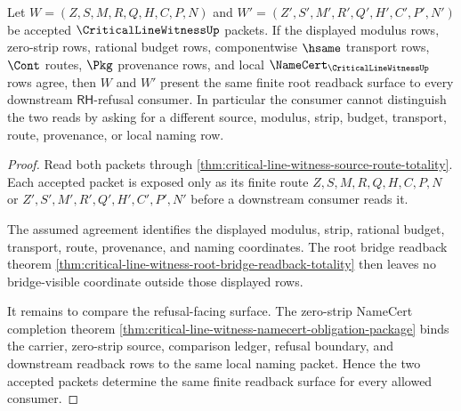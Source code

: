 \begin{theorem}
\label{thm:critical-line-witness-finite-budget-readback-determinacy}
Let $W=(Z,S,M,R,Q,H,C,P,N)$ and
$W'=(Z',S',M',R',Q',H',C',P',N')$ be accepted $\CriticalLineWitnessUp$ packets.
If the displayed modulus rows, zero-strip rows, rational budget rows,
componentwise $\hsame$ transport rows, $\Cont$ routes, $\Pkg$ provenance rows,
and local $\NameCert_{\CriticalLineWitnessUp}$ rows agree, then $W$ and $W'$
present the same finite root readback surface to every downstream
$\mathsf{RH}$-refusal consumer. In particular the consumer cannot distinguish
the two reads by asking for a different source, modulus, strip, budget,
transport, route, provenance, or local naming row.
\end{theorem}
\begin{proof}
Read both packets through
\autoref{thm:critical-line-witness-source-route-totality}. Each accepted
packet is exposed only as its finite route
$Z,S,M,R,Q,H,C,P,N$ or $Z',S',M',R',Q',H',C',P',N'$ before a downstream
consumer reads it.

The assumed agreement identifies the displayed modulus, strip, rational
budget, transport, route, provenance, and naming coordinates. The root bridge
readback theorem
\autoref{thm:critical-line-witness-root-bridge-readback-totality} then leaves
no bridge-visible coordinate outside those displayed rows.

It remains to compare the refusal-facing surface. The zero-strip NameCert
completion theorem
\autoref{thm:critical-line-witness-namecert-obligation-package} binds the
carrier, zero-strip source, comparison ledger, refusal boundary, and downstream
readback rows to the same local naming packet. Hence the two accepted packets
determine the same finite readback surface for every allowed consumer.
\end{proof}

